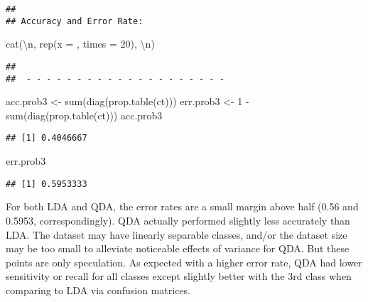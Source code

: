 \documentclass[
]{article}
\newenvironment{Shaded}{\begin{snugshade}}{\end{snugshade}}
\newcommand{\AttributeTok}[1]{\textcolor[rgb]{0.77,0.63,0.00}{#1}}
\newcommand{\DecValTok}[1]{\textcolor[rgb]{0.00,0.00,0.81}{#1}}
\newcommand{\FunctionTok}[1]{\textcolor[rgb]{0.00,0.00,0.00}{#1}}
\newcommand{\NormalTok}[1]{#1}
\newcommand{\OtherTok}[1]{\textcolor[rgb]{0.56,0.35,0.01}{#1}}
\newcommand{\SpecialCharTok}[1]{\textcolor[rgb]{0.00,0.00,0.00}{#1}}
\newcommand{\StringTok}[1]{\textcolor[rgb]{0.31,0.60,0.02}{#1}}
\begin{document}
\begin{verbatim}
## 
## Accuracy and Error Rate:
\end{verbatim}

\begin{Shaded}
\begin{Highlighting}[]
\FunctionTok{cat}\NormalTok{(}\StringTok{\textquotesingle{}}\SpecialCharTok{\textbackslash{}n}\StringTok{\textquotesingle{}}\NormalTok{, }\FunctionTok{rep}\NormalTok{(}\AttributeTok{x =} \StringTok{\textquotesingle{}{-}\textquotesingle{}}\NormalTok{, }\AttributeTok{times =} \DecValTok{20}\NormalTok{), }\StringTok{\textquotesingle{}}\SpecialCharTok{\textbackslash{}n}\StringTok{\textquotesingle{}}\NormalTok{)}
\end{Highlighting}
\end{Shaded}

\begin{verbatim}
## 
##  - - - - - - - - - - - - - - - - - - - -
\end{verbatim}

\begin{Shaded}
\begin{Highlighting}[]
\NormalTok{acc.prob3 }\OtherTok{\textless{}{-}} \FunctionTok{sum}\NormalTok{(}\FunctionTok{diag}\NormalTok{(}\FunctionTok{prop.table}\NormalTok{(ct)))}
\NormalTok{err.prob3 }\OtherTok{\textless{}{-}} \DecValTok{1} \SpecialCharTok{{-}} \FunctionTok{sum}\NormalTok{(}\FunctionTok{diag}\NormalTok{(}\FunctionTok{prop.table}\NormalTok{(ct)))}
\NormalTok{acc.prob3}
\end{Highlighting}
\end{Shaded}

\begin{verbatim}
## [1] 0.4046667
\end{verbatim}

\begin{Shaded}
\begin{Highlighting}[]
\NormalTok{err.prob3}
\end{Highlighting}
\end{Shaded}

\begin{verbatim}
## [1] 0.5953333
\end{verbatim}

For both LDA and QDA, the error rates are a small margin above half
(0.56 and 0.5953, correspondingly). QDA actually performed slightly less
accurately than LDA. The dataset may have linearly separable classes,
and/or the dataset size may be too small to alleviate noticeable effects
of variance for QDA. But these points are only speculation. As expected
with a higher error rate, QDA had lower sensitivity or recall for all
classes except slightly better with the 3rd class when comparing to LDA
via confusion matrices.
\end{document}
